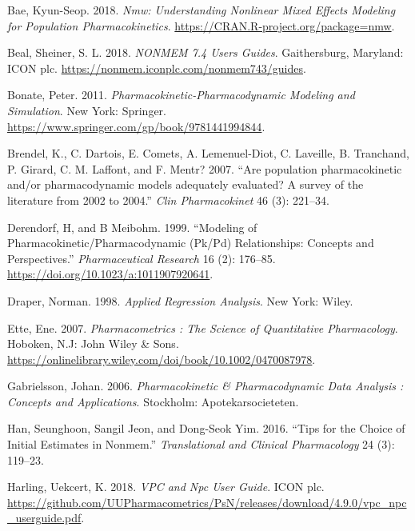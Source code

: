 \documentclass[
  10pt,
  krantz2,
  a4paper]{krantz}
\newlength{\cslhangindent}
\newenvironment{cslreferences}%
  {\setlength{\parindent}{0pt}%
  \everypar{\setlength{\hangindent}{\cslhangindent}}\ignorespaces}%
  {\par}
\theoremstyle{definition}
\theoremstyle{definition}
\theoremstyle{definition}
\theoremstyle{remark}
\begin{document}
\hypertarget{refs}{}
\begin{cslreferences}
\leavevmode\hypertarget{ref-R-nmw}{}%
Bae, Kyun-Seop. 2018. \emph{Nmw: Understanding Nonlinear Mixed Effects Modeling for Population Pharmacokinetics}. \url{https://CRAN.R-project.org/package=nmw}.

\leavevmode\hypertarget{ref-nonmem}{}%
Beal, Sheiner, S. L. 2018. \emph{NONMEM 7.4 Users Guides}. Gaithersburg, Maryland: ICON plc. \url{https://nonmem.iconplc.com/nonmem743/guides}.

\leavevmode\hypertarget{ref-bonate}{}%
Bonate, Peter. 2011. \emph{Pharmacokinetic-Pharmacodynamic Modeling and Simulation}. New York: Springer. \url{https://www.springer.com/gp/book/9781441994844}.

\leavevmode\hypertarget{ref-pmid17328581}{}%
Brendel, K., C. Dartois, E. Comets, A. Lemenuel-Diot, C. Laveille, B. Tranchand, P. Girard, C. M. Laffont, and F. Mentr? 2007. ``Are population pharmacokinetic and/or pharmacodynamic models adequately evaluated? A survey of the literature from 2002 to 2004.'' \emph{Clin Pharmacokinet} 46 (3): 221--34.

\leavevmode\hypertarget{ref-derendorf1999modeling}{}%
Derendorf, H, and B Meibohm. 1999. ``Modeling of Pharmacokinetic/Pharmacodynamic (Pk/Pd) Relationships: Concepts and Perspectives.'' \emph{Pharmaceutical Research} 16 (2): 176--85. \url{https://doi.org/10.1023/a:1011907920641}.

\leavevmode\hypertarget{ref-draper1998applied}{}%
Draper, Norman. 1998. \emph{Applied Regression Analysis}. New York: Wiley.

\leavevmode\hypertarget{ref-ette}{}%
Ette, Ene. 2007. \emph{Pharmacometrics : The Science of Quantitative Pharmacology}. Hoboken, N.J: John Wiley \& Sons. \url{https://onlinelibrary.wiley.com/doi/book/10.1002/0470087978}.

\leavevmode\hypertarget{ref-gabrielsson}{}%
Gabrielsson, Johan. 2006. \emph{Pharmacokinetic \& Pharmacodynamic Data Analysis : Concepts and Applications}. Stockholm: Apotekarsocieteten.

\leavevmode\hypertarget{ref-han2016tips}{}%
Han, Seunghoon, Sangil Jeon, and Dong-Seok Yim. 2016. ``Tips for the Choice of Initial Estimates in Nonmem.'' \emph{Translational and Clinical Pharmacology} 24 (3): 119--23.

\leavevmode\hypertarget{ref-vpcnpc}{}%
Harling, Uekcert, K. 2018. \emph{VPC and Npc User Guide}. ICON plc. \url{https://github.com/UUPharmacometrics/PsN/releases/download/4.9.0/vpc_npc_userguide.pdf}.


\end{cslreferences}
\end{document}
